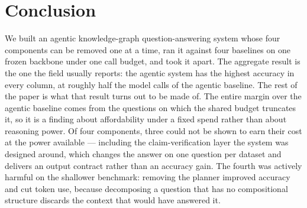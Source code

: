 %
%

\section{Conclusion}\label{sec:conclusion}

We built an agentic knowledge-graph question-answering system whose four
components can be removed one at a time, ran it against four baselines
on one frozen backbone under one call budget, and took it apart. The
aggregate result is the one the field usually reports: the agentic
system has the highest accuracy in every column, at roughly half the
model calls of the agentic baseline. The rest of the paper is what that
result turns out to be made of. The entire margin over the agentic
baseline comes from the questions on which the shared budget truncates
it, so it is a finding about affordability under a fixed spend rather
than about reasoning power. Of four components, three could not be shown
to earn their cost at the power available --- including the
claim-verification layer the system was designed around, which changes
the answer on one question per dataset and delivers an output contract
rather than an accuracy gain. The fourth was actively harmful on the
shallower benchmark: removing the planner improved accuracy and cut
token use, because decomposing a question that has no compositional
structure discards the context that would have answered it.

